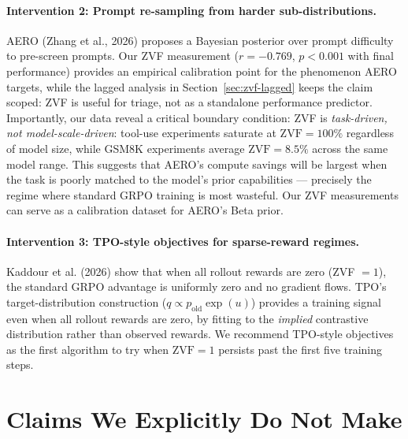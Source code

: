 \paragraph{Intervention 2: Prompt re-sampling from harder sub-distributions.}
AERO (Zhang et al., 2026) proposes a Bayesian posterior over prompt difficulty
to pre-screen prompts.
Our ZVF measurement ($r = -0.769$, $p < 0.001$ with final performance) provides
an empirical calibration point for the phenomenon AERO targets, while the
lagged analysis in Section~\ref{sec:zvf-lagged} keeps the claim scoped:
ZVF is useful for triage, not as a standalone performance predictor.
Importantly, our data reveal a critical boundary condition: ZVF is \emph{task-driven, not model-scale-driven}:
tool-use experiments saturate at $\text{ZVF} = 100\%$ regardless of model size,
while GSM8K experiments average $\text{ZVF} = 8.5\%$ across the same model
range.
This suggests that AERO's compute savings will be largest when the task is
poorly matched to the model's prior capabilities --- precisely the
regime where standard GRPO training is most wasteful.
Our ZVF measurements can serve as a calibration dataset for AERO's Beta prior.

\paragraph{Intervention 3: TPO-style objectives for sparse-reward regimes.}
Kaddour et al. (2026) show that when all rollout rewards are zero (ZVF $= 1$),
the standard GRPO advantage is uniformly zero and no gradient flows.
TPO's target-distribution construction ($q \propto p_\text{old} \exp(u)$)
provides a training signal even when all rollout rewards are zero, by fitting
to the \emph{implied} contrastive distribution rather than observed rewards.
We recommend TPO-style objectives as the first algorithm to try when
$\text{ZVF} = 1$ persists past the first five training steps.



\section*{Claims We Explicitly Do Not Make}
\label{sec:claims_we_do_not_make}

